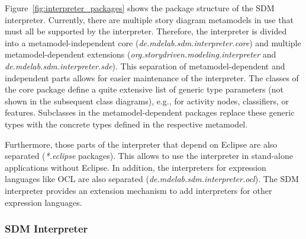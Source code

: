 Figure~\ref{fig:interpreter_packages} shows the package structure of the SDM interpreter.
Currently, there are multiple story diagram metamodels in use that must all be supported by the interpreter. 
Therefore, the interpreter is divided into a metamodel-independent core (\emph{de.mdelab.sdm.interpreter.core}) and multiple metamodel-dependent extensions (\emph{org.storydriven.modeling.interpreter} and \emph{de.mdelab.sdm.interpreter.sde}). 
This separation of metamodel-dependent and independent parts allows for easier maintenance of the interpreter. 
The classes of the core package define a quite extensive list of generic type parameters (not shown in the subsequent class diagrams), e.g., for activity nodes, classifiers, or features. 
Subclasses in the metamodel-dependent packages replace these generic types with the concrete types defined in the respective metamodel.

Furthermore, those parts of the interpreter that depend on Eclipse are also separated (\emph{*.eclipse} packages). 
This allows to use the interpreter in stand-alone applications without Eclipse. 
In addition, the interpreters for expression languages like OCL are also separated (\emph{de.mdelab.sdm.interpreter.ocl}). 
The SDM interpreter provides an extension mechanism to add interpreters for other expression languages.

\subsubsection{SDM Interpreter}
\label{sec:sdm_interpreter}

